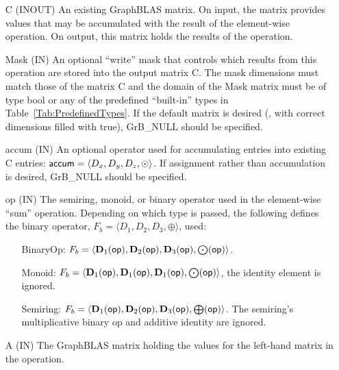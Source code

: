 \begin{itemize}[leftmargin=1.1in]
    \item[{\sf C}]    ({\sf INOUT}) An existing GraphBLAS matrix.  On input,
    the matrix provides values that may be accumulated with the result of the
    element-wise operation.  On output, this matrix holds the results of the
    operation.
    \item[{\sf Mask}] ({\sf IN}) An optional ``write'' mask that controls which
    results from this operation are stored into the output matrix {\sf C}. The 
    mask dimensions must match those of the matrix {\sf C} and the domain of the 
    {\sf Mask} matrix must be of type {\sf bool} or any of the predefined 
    ``built-in'' types in Table~\ref{Tab:PredefinedTypes}.  If the default
    matrix is desired (\ie, with correct dimensions filled with {\sf true}), 
    {\sf GrB\_NULL} should be specified.

    \item[{\sf accum}] ({\sf IN}) An optional operator used for accumulating
    entries into existing {\sf C} entries: ${\sf accum} = \langle D_x,
    D_y, D_z,\odot \rangle$. If assignment rather than accumulation is
    desired, {\sf GrB\_NULL} should be specified.

    \item[{\sf op}]    ({\sf IN}) The semiring, monoid, or binary operator 
    used in the element-wise ``sum'' operation.  Depending on which type is
    passed, the following defines the binary operator, 
    $F_b=\langle D_1,D_2,D_3,\oplus\rangle$, used:
    \begin{itemize}[leftmargin=1.1in]
    \item[BinaryOp:] $F_b = \langle \bold{D}_1({\sf op}), \bold{D}_2({\sf op}),
    \bold{D}_3({\sf op}),\bold{\bigodot}({\sf op})\rangle$.  
    \item[Monoid:] $F_b = \langle \bold{D}_1({\sf op}), \bold{D}_1({\sf op}),
    \bold{D}_1({\sf op}),\bold{\bigodot}({\sf op})\rangle$,
    the identity element is ignored. 
    \item[Semiring:] $F_b = \langle \bold{D}_1({\sf op}), \bold{D}_2({\sf op}),
    \bold{D}_3({\sf op}),\bold{\bigoplus}({\sf op})\rangle$.  The semiring's 
    multiplicative binary op and additive identity are ignored.
    \end{itemize}
    
    \item[{\sf A}]     ({\sf IN}) The GraphBLAS matrix holding the values for
    the left-hand matrix in the operation.
    

\end{itemize}
